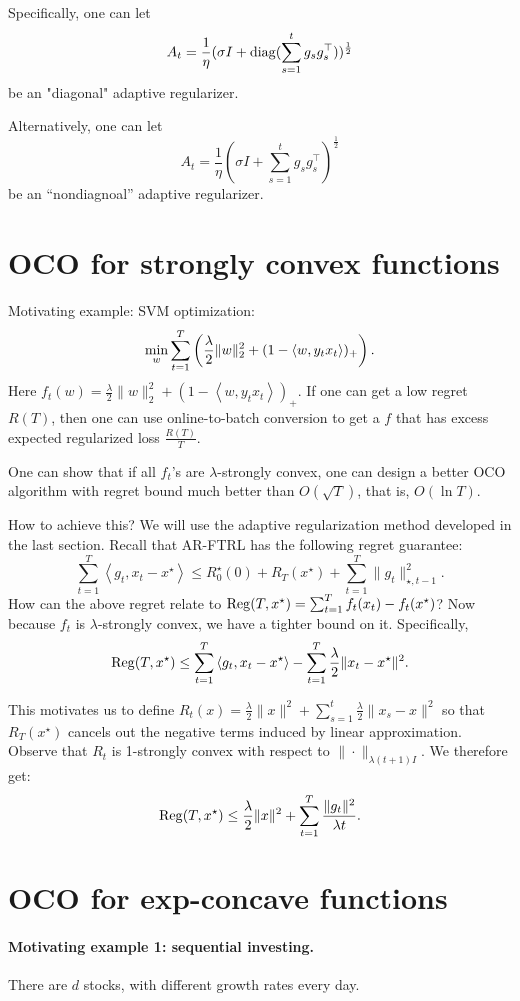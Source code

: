 \documentclass{article}
\DeclareMathOperator*{\diag}{{\rm diag}}
\DeclareMathOperator*{\Reg}{{\rm Reg}}
\newcommand{\inner}[2]{\left\langle #1,#2 \right\rangle}
\begin{document}
Specifically, one can let
\[ A_t = \frac1\eta (\sigma I + \diag( \sum_{s=1}^t g_s g_s^\top) )^\frac12\] be an "diagonal" adaptive regularizer.

Alternatively, one can let
\[ A_t = \frac1\eta (\sigma I + \sum_{s=1}^t g_s g_s^\top )^\frac12 \]
be an ``nondiagnoal'' adaptive regularizer.

\section{OCO for strongly convex functions}

Motivating example: SVM optimization:
\[ \min_{w} \sum_{t=1}^T \del{\frac\lambda2\|w\|_2^2 + (1-\inner{w}{y_t x_t})_+}. \]
Here $f_t(w) = \frac\lambda2\|w\|_2^2 + (1-\inner{w}{y_t x_t})_+$. If one can get a low regret $R(T)$, then one can use online-to-batch conversion to get a $f$ that has excess expected regularized loss $\frac{R(T)}{T}$.

One can show that if all $f_t$'s are $\lambda$-strongly convex, one can design a better OCO algorithm with regret bound much better than $O(\sqrt{T})$, that is, $O(\ln T)$.

How to achieve this? We will use the adaptive regularization method developed in the last section. Recall that AR-FTRL has the following regret guarantee:
\[ \sum_{t=1}^T \inner{g_t}{x_t - x^\star} \leq R_0^\star(0) + R_T(x^\star) + \sum_{t=1}^T \| g_t \|_{\star, t-1}^2. \]
How can the above regret relate to $\Reg(T, x^\star) = \sum_{t=1}^T f_t(x_t) - f_t(x^\star)$? Now because $f_t$ is $\lambda$-strongly convex, we have a tighter bound on it. Specifically,
\[ \Reg(T, x^\star) \leq \sum_{t=1}^T \inner{g_t}{x_t -x^\star} - \sum_{t=1}^T \frac\lambda 2\| x_t - x^\star \|^2. \]

This motivates us to define $R_t(x) = \frac\lambda 2\| x \|^2 + \sum_{s=1}^t \frac\lambda 2\| x_s - x \|^2$ so that $R_T(x^\star)$ cancels out the negative terms induced by linear approximation.
Observe that $R_t$ is 1-strongly convex with respect to $\| \cdot \|_{\lambda(t+1) I}$.
We therefore get:
\[ \Reg(T, x^\star) \leq \frac{\lambda}{2}\|x\|^2 + \sum_{t=1}^T \frac{\| g_t \|^2}{\lambda t}. \]


\section{OCO for exp-concave functions}

\paragraph{Motivating example 1: sequential investing.} There are $d$ stocks, with different growth rates every day.
\end{document}
